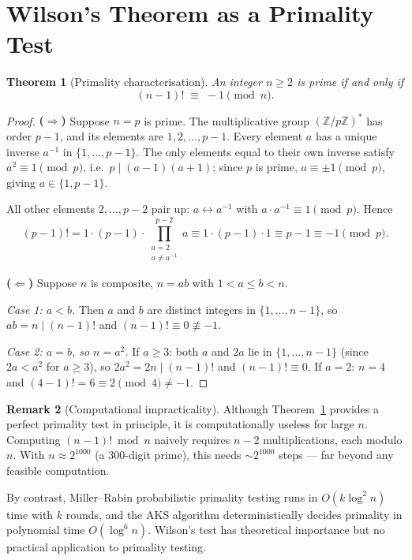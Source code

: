 \documentclass[12pt,a4paper]{amsart}
\newtheorem{theorem}{Theorem}[section]
\theoremstyle{definition}
\newtheorem{remark}[theorem]{Remark}
\newcommand{\Z}{\mathbb{Z}}
\begin{document}
\section{Wilson's Theorem as a Primality Test}

\begin{theorem}[Primality characterisation]\label{thm:primality}
  An integer $n \geq 2$ is prime if and only if
  \[
    (n-1)! \;\equiv\; -1 \pmod n.
  \]
\end{theorem}

\begin{proof}
  \textbf{($\Rightarrow$)} Suppose $n = p$ is prime.  The multiplicative group
  $(\Z/p\Z)^*$ has order $p-1$, and its elements are $1, 2, \ldots, p-1$.
  Every element $a$ has a unique inverse $a^{-1}$ in $\{1, \ldots, p-1\}$.
  The only elements equal to their own inverse satisfy $a^2 \equiv 1 \pmod p$,
  i.e.\ $p \mid (a-1)(a+1)$; since $p$ is prime, $a \equiv \pm 1 \pmod p$,
  giving $a \in \{1, p-1\}$.

  All other elements $2, \ldots, p-2$ pair up: $a \leftrightarrow a^{-1}$
  with $a \cdot a^{-1} \equiv 1 \pmod p$.  Hence
  \[
    (p-1)! = 1 \cdot (p-1) \cdot \prod_{\substack{a=2\\a \neq a^{-1}}}^{p-2} a
    \equiv 1 \cdot (p-1) \cdot 1 \equiv p-1 \equiv -1 \pmod p.
  \]

  \textbf{($\Leftarrow$)} Suppose $n$ is composite, $n = ab$ with $1 < a \leq b < n$.

  \emph{Case 1: $a < b$.}  Then $a$ and $b$ are distinct integers in
  $\{1, \ldots, n-1\}$, so $ab = n \mid (n-1)!$ and $(n-1)! \equiv 0 \not\equiv -1$.

  \emph{Case 2: $a = b$, so $n = a^2$.}
  If $a \geq 3$: both $a$ and $2a$ lie in $\{1, \ldots, n-1\}$ (since
  $2a < a^2$ for $a \geq 3$), so $2a^2 = 2n \mid (n-1)!$ and $(n-1)! \equiv 0$.
  If $a = 2$: $n = 4$ and $(4-1)! = 6 \equiv 2 \pmod 4 \neq -1$.
\end{proof}

\begin{remark}[Computational impracticality]
  Although Theorem~\ref{thm:primality} provides a perfect primality test in
  principle, it is computationally useless for large $n$.  Computing $(n-1)!
  \bmod n$ naively requires $n-2$ multiplications, each modulo $n$.
  With $n \approx 2^{1000}$ (a $300$-digit prime), this needs $\sim 2^{1000}$
  steps — far beyond any feasible computation.

  By contrast, Miller--Rabin probabilistic primality testing runs in
  $O(k \log^2 n)$ time with $k$ rounds, and the AKS algorithm \cite{Agrawal2004}
  deterministically decides primality in polynomial time $O(\log^{6} n)$.
  Wilson's test has theoretical importance but no practical application to
  primality testing.
\end{remark}
\end{document}
